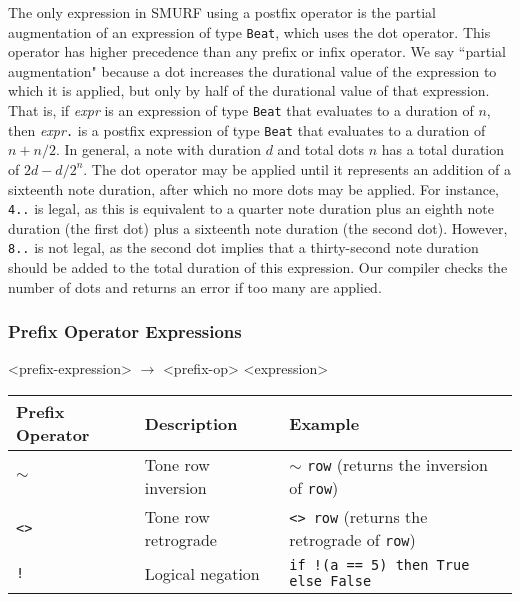 The only expression in SMURF using a postfix operator is the partial augmentation of an expression
of type \texttt{Beat}, which uses the dot operator. This operator has higher precedence than any prefix or infix operator.
We say ``partial augmentation" because a dot increases the durational value of
the expression to which it is applied, but only by half of the durational value of that expression.
That is, if \emph{expr} is an expression of type \texttt{Beat} that evaluates to a duration of $n$, 
then \emph{expr}\texttt{.} is a postfix expression of type \texttt{Beat} 
that evaluates to a duration of $n + n/2$. In general, a note with duration $d$ and total dots $n$ has a total
duration of $2d - d/2^n$. The dot operator may be applied until it represents an addition of a sixteenth note
duration, after which no more dots may be applied. For instance, \texttt{4..} is legal, as this
is equivalent to a quarter note duration plus an eighth note duration (the first dot) plus a
sixteenth note duration (the second dot). However, \texttt{8..} is not legal, as the second
dot implies that a thirty-second note duration should be added to the total duration of this
expression. Our compiler checks the number of dots and returns an error if too many are applied.

\subsubsection{Prefix Operator Expressions}
\label{sec:prefixop}
\begin{grammar}
<prefix-expression> $\rightarrow$ <prefix-op> <expression>
\end{grammar}


\begin{table} [H]
\centering
\begin{tabularx}{0.9\textwidth}{llX}
\hline\hline
Prefix Operator & Description & Example \\
\hline\hline
   \texttt{$\sim$} & Tone row inversion & $\sim$ \texttt{row} (returns the inversion of \texttt{row})\\ \hline
   \texttt{<>} & Tone row retrograde & \texttt{<>}~\texttt{row} (returns the
           retrograde of \texttt{row})\\ \hline
   \texttt{!} & Logical negation & \texttt{if !(a == 5) then True else False} \\ \hline
\end{tabularx}
\end{table}

